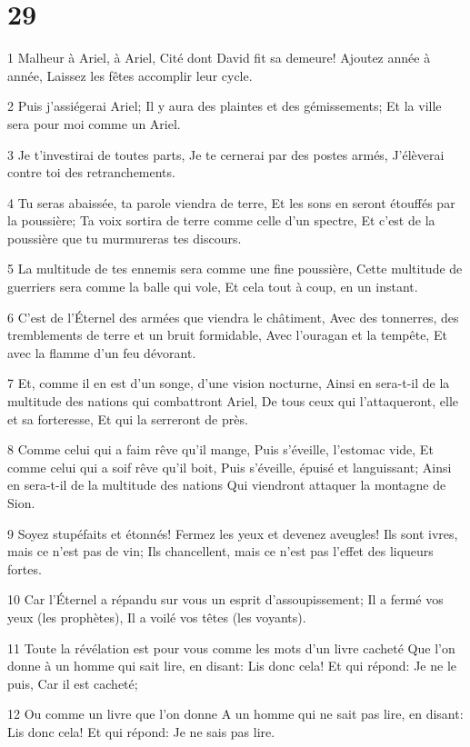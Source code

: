 \chapter{29}

\par 1 Malheur à Ariel, à Ariel, Cité dont David fit sa demeure! Ajoutez année à année, Laissez les fêtes accomplir leur cycle.
\par 2 Puis j'assiégerai Ariel; Il y aura des plaintes et des gémissements; Et la ville sera pour moi comme un Ariel.
\par 3 Je t'investirai de toutes parts, Je te cernerai par des postes armés, J'élèverai contre toi des retranchements.
\par 4 Tu seras abaissée, ta parole viendra de terre, Et les sons en seront étouffés par la poussière; Ta voix sortira de terre comme celle d'un spectre, Et c'est de la poussière que tu murmureras tes discours.
\par 5 La multitude de tes ennemis sera comme une fine poussière, Cette multitude de guerriers sera comme la balle qui vole, Et cela tout à coup, en un instant.
\par 6 C'est de l'Éternel des armées que viendra le châtiment, Avec des tonnerres, des tremblements de terre et un bruit formidable, Avec l'ouragan et la tempête, Et avec la flamme d'un feu dévorant.
\par 7 Et, comme il en est d'un songe, d'une vision nocturne, Ainsi en sera-t-il de la multitude des nations qui combattront Ariel, De tous ceux qui l'attaqueront, elle et sa forteresse, Et qui la serreront de près.
\par 8 Comme celui qui a faim rêve qu'il mange, Puis s'éveille, l'estomac vide, Et comme celui qui a soif rêve qu'il boit, Puis s'éveille, épuisé et languissant; Ainsi en sera-t-il de la multitude des nations Qui viendront attaquer la montagne de Sion.
\par 9 Soyez stupéfaits et étonnés! Fermez les yeux et devenez aveugles! Ils sont ivres, mais ce n'est pas de vin; Ils chancellent, mais ce n'est pas l'effet des liqueurs fortes.
\par 10 Car l'Éternel a répandu sur vous un esprit d'assoupissement; Il a fermé vos yeux (les prophètes), Il a voilé vos têtes (les voyants).
\par 11 Toute la révélation est pour vous comme les mots d'un livre cacheté Que l'on donne à un homme qui sait lire, en disant: Lis donc cela! Et qui répond: Je ne le puis, Car il est cacheté;
\par 12 Ou comme un livre que l'on donne A un homme qui ne sait pas lire, en disant: Lis donc cela! Et qui répond: Je ne sais pas lire.
